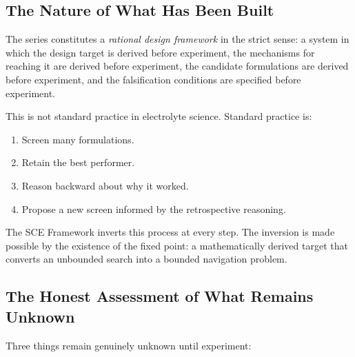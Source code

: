 \documentclass[11pt]{article}
\theoremstyle{plain}
\theoremstyle{definition}
\theoremstyle{remark}
\begin{document}
\subsection{The Nature of What Has Been Built}

The series constitutes a \emph{rational design framework} in the
strict sense: a system in which the design target is derived
before experiment, the mechanisms for reaching it are derived
before experiment, the candidate formulations are derived before
experiment, and the falsification conditions are specified before
experiment.

This is not standard practice in electrolyte science.  Standard
practice is:
\begin{enumerate}[leftmargin=2em]
  \item Screen many formulations.
  \item Retain the best performer.
  \item Reason backward about why it worked.
  \item Propose a new screen informed by the retrospective reasoning.
\end{enumerate}

The SCE Framework inverts this process at every step.  The inversion
is made possible by the existence of the fixed point: a
mathematically derived target that converts an unbounded search
into a bounded navigation problem.

\subsection{The Honest Assessment of What Remains Unknown}

Three things remain genuinely unknown until experiment:
\end{document}
